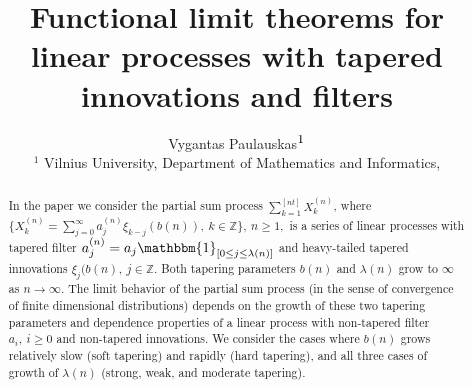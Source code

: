 \documentclass[12pt]{article}
\def\bz{{\bf Z}}
\def\bz{{\mathbb Z}} %
\def\l{\lambda}
\newcommand{\ind}[1]{\mathbbm{1}_{#1}}
\theoremstyle{plain}
\theoremstyle{definition}
\begin{document}
\title{Functional limit theorems for linear processes with tapered innovations and filters
\footnotemark[0]
\footnotemark[0] \footnotemark[0]
\footnotemark[0]
}


\author{ Vygantas Paulauskas$^{\text{\small 1}}$ \\
{\small $^{\text{1}}$ Vilnius University, Department of Mathematics
and
 Informatics,}\\}




\maketitle

\begin{abstract}

In the paper we consider the partial sum process $\sum_{k=1}^{[nt]}X_k^{(n)}$, where $\{X_k^{(n)}=\sum_{j=0}^{\infty} a_{j}^{(n)}\xi_{k-j}(b(n)), \ k\in \bz\},\ n\ge 1,$ is a series of linear processes with tapered filter $a_{j}^{(n)}=a_{j}\ind{[0\le j\le \l(n)]}$ and  heavy-tailed tapered innovations $\xi_{j}(b(n), \ j\in \bz$. Both tapering parameters  $b(n)$ and $\l(n)$ grow to  $\infty$ as $n\to \infty$. The limit behavior of the partial sum process (in the sense of convergence of finite dimensional distributions) depends on the growth of these two tapering parameters and dependence properties of a linear process with non-tapered filter $a_i, \ i\ge 0$ and non-tapered innovations. We consider the cases where $b(n)$ grows relatively slow (soft tapering) and rapidly (hard tapering), and all three cases of growth of $\l(n)$ (strong, weak, and moderate tapering).

\end{abstract}
\end{document}
